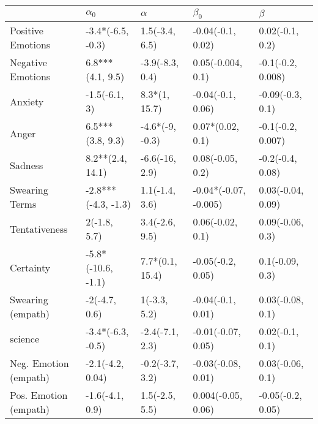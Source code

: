 \begin{tabular}{lllll}
\toprule
{} &           $\alpha_0$ &         $\alpha$ &              $\beta_0$ &            $\beta$ \\
\midrule
Positive Emotions     &    -3.4*(-6.5, -0.3) &   1.5(-3.4, 6.5) &      -0.04(-0.1, 0.02) &    0.02(-0.1, 0.2) \\
Negative Emotions     &     6.8***(4.1, 9.5) &  -3.9(-8.3, 0.4) &      0.05(-0.004, 0.1) &  -0.1(-0.2, 0.008) \\
Anxiety               &        -1.5(-6.1, 3) &    8.3*(1, 15.7) &      -0.04(-0.1, 0.06) &   -0.09(-0.3, 0.1) \\
Anger                 &     6.5***(3.8, 9.3) &  -4.6*(-9, -0.3) &       0.07*(0.02, 0.1) &  -0.1(-0.2, 0.007) \\
Sadness               &     8.2**(2.4, 14.1) &   -6.6(-16, 2.9) &       0.08(-0.05, 0.2) &   -0.2(-0.4, 0.08) \\
Swearing Terms        &  -2.8***(-4.3, -1.3) &   1.1(-1.4, 3.6) &  -0.04*(-0.07, -0.005) &  0.03(-0.04, 0.09) \\
Tentativeness         &         2(-1.8, 5.7) &   3.4(-2.6, 9.5) &       0.06(-0.02, 0.1) &   0.09(-0.06, 0.3) \\
Certainty             &   -5.8*(-10.6, -1.1) &  7.7*(0.1, 15.4) &      -0.05(-0.2, 0.05) &    0.1(-0.09, 0.3) \\
Swearing (empath)     &        -2(-4.7, 0.6) &     1(-3.3, 5.2) &      -0.04(-0.1, 0.01) &   0.03(-0.08, 0.1) \\
science               &    -3.4*(-6.3, -0.5) &  -2.4(-7.1, 2.3) &     -0.01(-0.07, 0.05) &    0.02(-0.1, 0.1) \\
Neg. Emotion (empath) &     -2.1(-4.2, 0.04) &  -0.2(-3.7, 3.2) &     -0.03(-0.08, 0.01) &   0.03(-0.06, 0.1) \\
Pos. Emotion (empath) &      -1.6(-4.1, 0.9) &   1.5(-2.5, 5.5) &     0.004(-0.05, 0.06) &  -0.05(-0.2, 0.05) \\
\bottomrule
\end{tabular}
